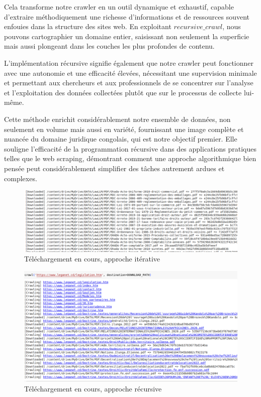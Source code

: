 Cela transforme notre crawler en un outil dynamique et exhaustif, capable d'extraire méthodiquement une richesse d'informations et de ressources souvent enfouies dans la structure des sites web. En exploitant $recursive\_crawl$, nous pouvons cartographier un domaine entier, saisissant non seulement la superficie mais aussi plongeant dans les couches les plus profondes de contenu.

L'implémentation récursive signifie également que notre crawler peut fonctionner avec une autonomie et une efficacité élevées, nécessitant une supervision minimale et permettant aux chercheurs et aux professionnels de se concentrer sur l'analyse et l'exploitation des données collectées plutôt que sur le processus de collecte lui-même.

Cette méthode enrichit considérablement notre ensemble de données, non seulement en volume mais aussi en variété, fournissant une image complète et nuancée du domaine juridique congolais, qui est notre objectif premier. Elle souligne l'efficacité de la programmation récursive dans des applications pratiques telles que le web scraping, démontrant comment une approche algorithmique bien pensée peut considérablement simplifier des tâches autrement ardues et complexes.

\begin{figure}[H]
    \centering
    \includegraphics[width=15cm]{gfx/fig-crawler-downloading.png}
    \caption{Téléchargement en cours, approche itérative}
    \label{fig:crawler-downloading}
\end{figure}

\begin{figure}[H]
    \centering
    \includegraphics[width=15cm]{gfx/fig-download-recursive.png}
    \caption{Téléchargement en cours, approche récursive}
    \label{fig:crawler-downloading}
\end{figure}

